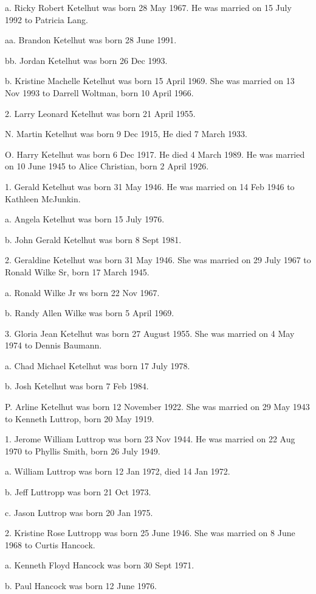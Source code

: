 \documentclass[a4paper]{article}
\begin{document}
a. Ricky Robert Ketelhut was born 28 May 1967.  He was married on 15 July 1992 to Patricia Lang.

aa. Brandon Ketelhut was born 28 June 1991.

bb. Jordan Ketelhut was born 26 Dec 1993.

b. Kristine Machelle Ketelhut was born 15 April 1969.  She was married on 13 Nov 1993 to Darrell Woltman, born 10 April 1966.

2. Larry Leonard Ketelhut was born 21 April 1955.

N. Martin Ketelhut was born 9 Dec 1915,  He died 7 March 1933.

O. Harry Ketelhut was born 6 Dec 1917.  He died 4 March 1989.  He was married on 10 June 1945 to Alice Christian, born 2 April 1926.

1. Gerald Ketelhut was born 31 May 1946.  He was married on 14 Feb 1946 to Kathleen McJunkin.

a. Angela Ketelhut was born 15 July 1976.

b. John Gerald Ketelhut was born 8 Sept 1981.  

2. Geraldine Ketelhut was born 31 May 1946.  She was married on 29 July 1967 to Ronald Wilke Sr, born 17 March 1945.

a. Ronald Wilke Jr ws born 22 Nov 1967.

b. Randy Allen Wilke was born 5 April 1969.

3. Gloria Jean Ketelhut was born 27 August 1955.  She was married on 4 May 1974 to Dennis Baumann.

a. Chad Michael Ketelhut was born 17 July 1978.

b. Josh Ketelhut was born 7 Feb 1984.  

P. Arline Ketelhut was born 12 November 1922.  She was married on 29 May 1943 to Kenneth Luttrop, born 20 May 1919.

1. Jerome William Luttrop was born 23 Nov 1944.  He was married on 22 Aug 1970 to Phyllis Smith, born 26 July 1949.

a. William Luttrop was born 12 Jan 1972, died 14 Jan 1972.

b. Jeff Luttropp was born 21 Oct 1973.

c. Jason Luttrop was born 20 Jan 1975.

2. Kristine Rose Luttropp was born 25 June 1946.  She was married on 8 June 1968 to Curtis Hancock.  

a. Kenneth Floyd Hancock was born 30 Sept 1971.

b. Paul Hancock was born 12 June 1976.
\end{document}

